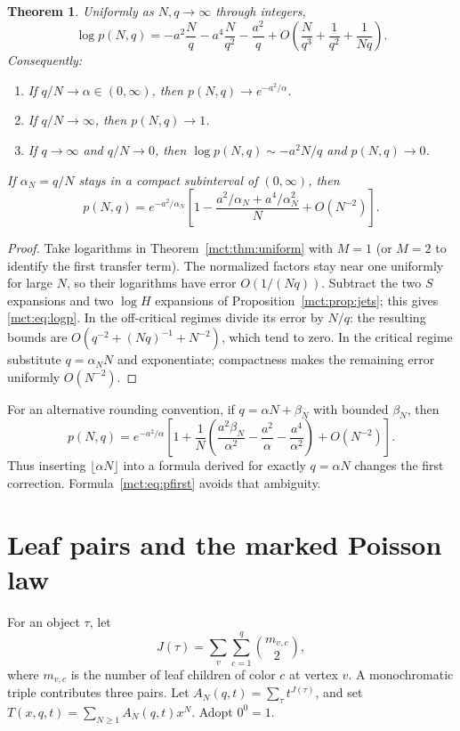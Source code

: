 \documentclass[11pt]{article}
\newtheorem{theorem}{Theorem}[section]
\theoremstyle{definition}
\begin{document}
\begin{theorem}\label{mct:thm:crossover}
Uniformly as $N,q\to\infty$ through integers,
\begin{equation}\label{mct:eq:logp}
 \log p(N,q)=-a^2\frac Nq-a^4\frac N{q^2}-\frac{a^2}q
 +O\left(\frac N{q^3}+\frac1{q^2}+\frac1{Nq}\right).
\end{equation}
Consequently:
\begin{enumerate}
\item If $q/N\to\alpha\in(0,\infty)$, then $p(N,q)\to e^{-a^2/\alpha}$.
\item If $q/N\to\infty$, then $p(N,q)\to1$.
\item If $q\to\infty$ and $q/N\to0$, then $\log p(N,q)\sim-a^2N/q$ and $p(N,q)\to0$.
\end{enumerate}
If $\alpha_N=q/N$ stays in a compact subinterval of $(0,\infty)$, then
\begin{equation}\label{mct:eq:pfirst}
 p(N,q)=e^{-a^2/\alpha_N}
 \left[1-\frac{a^2/\alpha_N+a^4/\alpha_N^2}{N}+O(N^{-2})\right].
\end{equation}
\end{theorem}
\begin{proof}
Take logarithms in Theorem~\ref{mct:thm:uniform} with $M=1$ (or $M=2$ to identify the first transfer term). The normalized factors stay near one uniformly for large $N$, so their logarithms have error $O(1/(Nq))$. Subtract the two $S$ expansions and two $\log H$ expansions of Proposition~\ref{mct:prop:jets}; this gives \eqref{mct:eq:logp}. In the off-critical regimes divide its error by $N/q$: the resulting bounds are $O(q^{-2}+(Nq)^{-1}+N^{-2})$, which tend to zero. In the critical regime substitute $q=\alpha_NN$ and exponentiate; compactness makes the remaining error uniformly $O(N^{-2})$.
\end{proof}
For an alternative rounding convention, if $q=\alpha N+\beta_N$ with bounded $\beta_N$, then
\begin{equation}\label{mct:eq:rounding}
 p(N,q)=e^{-a^2/\alpha}\left[1+\frac1N
 \left(\frac{a^2\beta_N}{\alpha^2}-\frac{a^2}{\alpha}-\frac{a^4}{\alpha^2}\right)
 +O(N^{-2})\right].
\end{equation}
Thus inserting $\lfloor\alpha N\rfloor$ into a formula derived for exactly $q=\alpha N$ changes the first correction. Formula~\eqref{mct:eq:pfirst} avoids that ambiguity.

\section{Leaf pairs and the marked Poisson law}\label{mct:sec:marked}
For an object $\tau$, let
\[
 J(\tau)=\sum_{v}\sum_{c=1}^q\binom{m_{v,c}}2,
\]
where $m_{v,c}$ is the number of leaf children of color $c$ at vertex $v$. A monochromatic triple contributes three pairs. Let $A_N(q,t)=\sum_\tau t^{J(\tau)}$, and set $T(x,q,t)=\sum_{N\ge1}A_N(q,t)x^N$. Adopt $0^0=1$.
\end{document}

